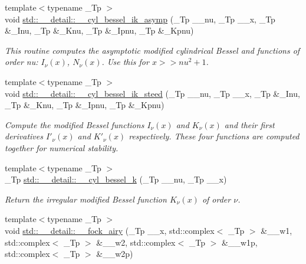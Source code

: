 \begin{DoxyCompactItemize}
{\footnotesize template$<$typename \+\_\+\+Tp $>$ }\\void \hyperlink{namespacestd_1_1____detail_a7386732bb6f0d45bbcbccaad436797a0}{std\+::\+\_\+\+\_\+detail\+::\+\_\+\+\_\+cyl\+\_\+bessel\+\_\+ik\+\_\+asymp} (\+\_\+\+Tp \+\_\+\+\_\+nu, \+\_\+\+Tp \+\_\+\+\_\+x, \+\_\+\+Tp \&\+\_\+\+Inu, \+\_\+\+Tp \&\+\_\+\+Knu, \+\_\+\+Tp \&\+\_\+\+Ipnu, \+\_\+\+Tp \&\+\_\+\+Kpnu)
\begin{DoxyCompactList}\small\item\em This routine computes the asymptotic modified cylindrical Bessel and functions of order nu\+: $ I_{\nu}(x) $, $ N_{\nu}(x) $. Use this for $ x >> nu^2 + 1 $. \end{DoxyCompactList}\item 
{\footnotesize template$<$typename \+\_\+\+Tp $>$ }\\void \hyperlink{namespacestd_1_1____detail_aed8927c2ec079a1831da66abcfae802b}{std\+::\+\_\+\+\_\+detail\+::\+\_\+\+\_\+cyl\+\_\+bessel\+\_\+ik\+\_\+steed} (\+\_\+\+Tp \+\_\+\+\_\+nu, \+\_\+\+Tp \+\_\+\+\_\+x, \+\_\+\+Tp \&\+\_\+\+Inu, \+\_\+\+Tp \&\+\_\+\+Knu, \+\_\+\+Tp \&\+\_\+\+Ipnu, \+\_\+\+Tp \&\+\_\+\+Kpnu)
\begin{DoxyCompactList}\small\item\em Compute the modified Bessel functions $ I_\nu(x) $ and $ K_\nu(x) $ and their first derivatives $ I'_\nu(x) $ and $ K'_\nu(x) $ respectively. These four functions are computed together for numerical stability. \end{DoxyCompactList}\item 
{\footnotesize template$<$typename \+\_\+\+Tp $>$ }\\\+\_\+\+Tp \hyperlink{namespacestd_1_1____detail_ac9152f2369a18aa795fe24ccfa6dcf12}{std\+::\+\_\+\+\_\+detail\+::\+\_\+\+\_\+cyl\+\_\+bessel\+\_\+k} (\+\_\+\+Tp \+\_\+\+\_\+nu, \+\_\+\+Tp \+\_\+\+\_\+x)
\begin{DoxyCompactList}\small\item\em Return the irregular modified Bessel function $ K_{\nu}(x) $ of order $ \nu $. \end{DoxyCompactList}\item 
{\footnotesize template$<$typename \+\_\+\+Tp $>$ }\\void \hyperlink{namespacestd_1_1____detail_a96ccd15b0c375170be157136faa47387}{std\+::\+\_\+\+\_\+detail\+::\+\_\+\+\_\+fock\+\_\+airy} (\+\_\+\+Tp \+\_\+\+\_\+x, std\+::complex$<$ \+\_\+\+Tp $>$ \&\+\_\+\+\_\+w1, std\+::complex$<$ \+\_\+\+Tp $>$ \&\+\_\+\+\_\+w2, std\+::complex$<$ \+\_\+\+Tp $>$ \&\+\_\+\+\_\+w1p, std\+::complex$<$ \+\_\+\+Tp $>$ \&\+\_\+\+\_\+w2p)

\end{DoxyCompactItemize}
